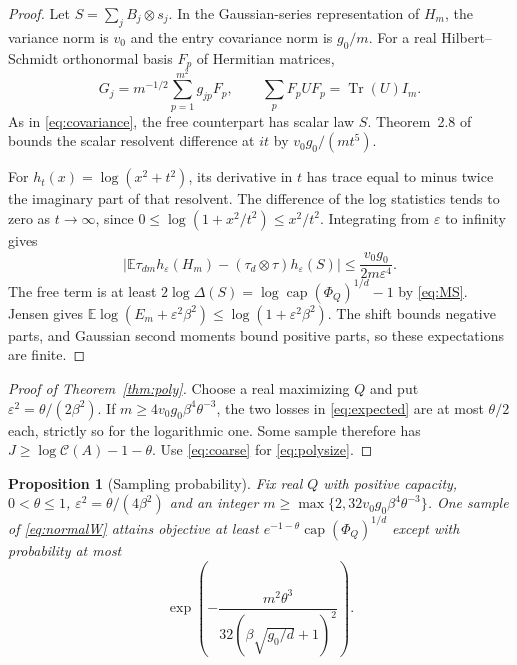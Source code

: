 \documentclass[11pt]{article}
\newtheorem{proposition}[theorem]{Proposition}
\newcommand{\E}{\mathbb E}
\newcommand{\Tr}{\operatorname{Tr}}
\newcommand{\capop}{\operatorname{cap}}
\newcommand{\K}{\mathcal C}
\begin{document}
\begin{proof}
Let $S=\sum_jB_j\otimes s_j$. In the Gaussian-series representation of $H_m$, the variance norm is $v_0$ and the entry covariance norm is $g_0/m$. For a real Hilbert--Schmidt orthonormal basis $F_p$ of Hermitian matrices,
\[
 G_j=m^{-1/2}\sum_{p=1}^{m^2}g_{jp}F_p,\qquad
 \sum_pF_pUF_p=\Tr(U)I_m.
\]
As in \eqref{eq:covariance}, the free counterpart has scalar law $S$. Theorem~2.8 of \cite{bbvh} bounds the scalar resolvent difference at $it$ by $v_0g_0/(mt^5)$.

For $h_t(x)=\log(x^2+t^2)$, its derivative in $t$ has trace equal to minus twice the imaginary part of that resolvent. The difference of the log statistics tends to zero as $t\to\infty$, since $0\le\log(1+x^2/t^2)\le x^2/t^2$. Integrating from $\varepsilon$ to infinity gives
\begin{equation}\label{eq:integrated}
 \left|\E\tau_{dm}h_\varepsilon(H_m)-(\tau_d\otimes\tau)h_\varepsilon(S)\right|
 \le\frac{v_0g_0}{2m\varepsilon^4}.
\end{equation}
The free term is at least $2\log\Delta(S)=\log\capop(\Phi_Q)^{1/d}-1$ by \eqref{eq:MS}. Jensen gives $\E\log(E_m+\varepsilon^2\beta^2)\le\log(1+\varepsilon^2\beta^2)$. The shift bounds negative parts, and Gaussian second moments bound positive parts, so these expectations are finite.
\end{proof}
\begin{proof}[Proof of Theorem~\ref{thm:poly}]
Choose a real maximizing $Q$ and put $\varepsilon^2=\theta/(2\beta^2)$. If $m\ge4v_0g_0\beta^4\theta^{-3}$, the two losses in \eqref{eq:expected} are at most $\theta/2$ each, strictly so for the logarithmic one. Some sample therefore has $J\ge\log\K(A)-1-\theta$. Use \eqref{eq:coarse} for \eqref{eq:polysize}.
\end{proof}
\begin{proposition}[Sampling probability]\label{prop:prob}
Fix real $Q$ with positive capacity, $0<\theta\le1$, $\varepsilon^2=\theta/(4\beta^2)$ and an integer $m\ge\max\{2,32v_0g_0\beta^4\theta^{-3}\}$. One sample of \eqref{eq:normalW} attains objective at least $e^{-1-\theta}\capop(\Phi_Q)^{1/d}$ except with probability at most
\begin{equation}\label{eq:prob}
 \exp\left(-\frac{m^2\theta^3}{32(\beta\sqrt{g_0/d}+1)^2}\right).
\end{equation}
\end{proposition}
\end{document}
